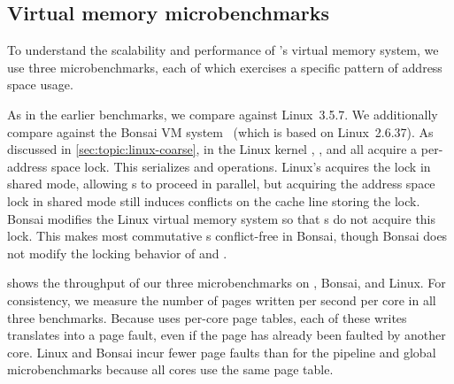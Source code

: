 %   

\begin{comment}
\begin{figure}
  \centering
  
  \caption{Scalability of $n$ cores forking and exiting a process on xv6
    and Linux.}
  \label{fig:forktest}
\end{figure}
\end{comment}


\subsection{Virtual memory microbenchmarks}

To understand the scalability and performance of \sys's \vm virtual
memory system, we use three microbenchmarks, each of which exercises a
specific pattern of address space usage.

As in the earlier benchmarks, we compare \vm against Linux~3.5.7.  We
additionally compare against the Bonsai VM
system~\cite{clements:bonsai} (which is based on Linux~2.6.37).
%
As discussed in \cref{sec:topic:linux-coarse}, in the Linux kernel
, , and  all acquire a
per-address space lock.  This serializes  and 
operations.  Linux's  acquires the lock in shared
mode, allowing s to proceed in parallel, but acquiring
the address space lock in shared mode still induces conflicts on the
cache line storing the lock.
%
Bonsai modifies the Linux virtual memory system so that
s do not acquire this lock.  This makes most
commutative s conflict-free in Bonsai, though Bonsai
does not modify the locking behavior of  and .

 shows the throughput of our three microbenchmarks
on \sys, Bonsai, and Linux.
%
For consistency, we measure the number of pages written per second per
core in all three benchmarks.
%
Because \sys uses per-core page tables, each of these writes
translates into a page fault, even if the page has already been
faulted by another core.
%
Linux and Bonsai incur fewer page faults than \sys for the pipeline
and global microbenchmarks because all cores use the same page table.

